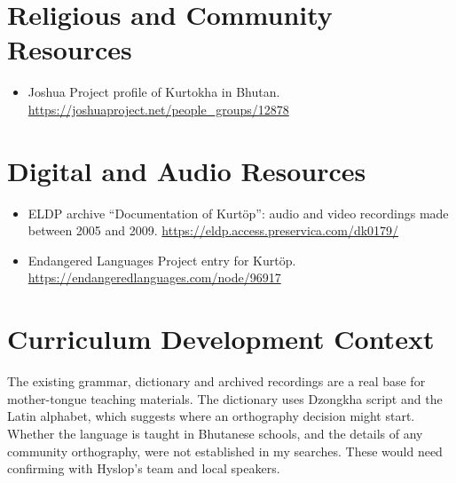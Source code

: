 \documentclass[12pt]{article}
\begin{document}
\section{Religious and Community Resources}
\begin{itemize}
\item Joshua Project profile of Kurtokha in Bhutan. \url{https://joshuaproject.net/people_groups/12878}
\end{itemize}

\section{Digital and Audio Resources}
\begin{itemize}
\item ELDP archive ``Documentation of Kurt\"op'': audio and video recordings made between 2005 and 2009. \url{https://eldp.access.preservica.com/dk0179/}
\item Endangered Languages Project entry for Kurt\"op. \url{https://endangeredlanguages.com/node/96917}
\end{itemize}

\section{Curriculum Development Context}
The existing grammar, dictionary and archived recordings are a real base for mother-tongue teaching materials. The dictionary uses Dzongkha script and the Latin alphabet, which suggests where an orthography decision might start. Whether the language is taught in Bhutanese schools, and the details of any community orthography, were not established in my searches. These would need confirming with Hyslop's team and local speakers.
\end{document}
